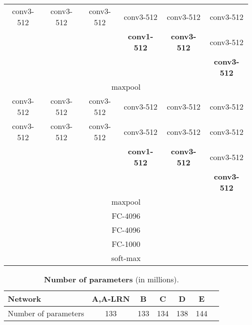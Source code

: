 \documentclass{article} %
\begin{document}
\begin{table}[htb]
\begin{tabular}{|c|c|c|c|c|c|}
conv3-512 & conv3-512 & conv3-512 & conv3-512 & conv3-512 & conv3-512 \\ 
& & & \textbf{conv1-512} & \textbf{conv3-512} & conv3-512 \\ 
& & & & & \textbf{conv3-512} \\ \hline
\multicolumn{6}{|c|}{maxpool} \\ \hline
conv3-512 & conv3-512 & conv3-512 & conv3-512 & conv3-512 & conv3-512 \\ 
conv3-512 & conv3-512 & conv3-512 & conv3-512 & conv3-512 & conv3-512 \\ 
& & & \textbf{conv1-512} & \textbf{conv3-512} & conv3-512 \\ 
& & & & & \textbf{conv3-512} \\ \hline
\multicolumn{6}{|c|}{maxpool} \\ \hline
\multicolumn{6}{|c|}{FC-4096} \\ \hline
\multicolumn{6}{|c|}{FC-4096} \\ \hline
\multicolumn{6}{|c|}{FC-1000} \\ \hline
\multicolumn{6}{|c|}{soft-max} \\ \hline
\end{tabular}
\label{tab:config}
\end{table}
\begin{table}[htb]
\small
\centering
\caption{\textbf{Number of parameters} (in millions).}
\begin{tabular}{|l|c|c|c|c|c|c|} \hline
Network & A,A-LRN & B & C & D & E \\ \hline
Number of parameters & 133 & 133 & 134 & 138 & 144 \\ \hline
\end{tabular}
\label{tab:num_params}
\end{table}
\end{document}
